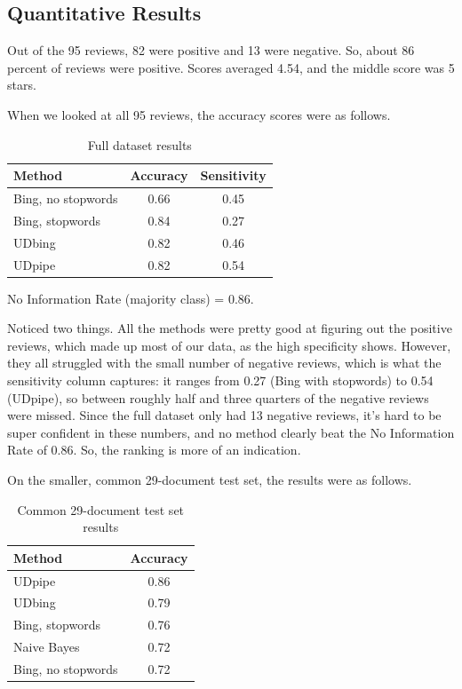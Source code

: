 \documentclass[12pt, a4paper]{article}
\begin{document}
\subsection{Quantitative Results}

Out of the 95 reviews, 82 were positive and 13 were negative. So, about 86 percent of reviews were positive. Scores averaged 4.54, and the middle score was 5 stars.

When we looked at all 95 reviews, the accuracy scores were as follows.

\begin{table}[h]
\centering
\caption{Full dataset results}
\begin{tabular}{lcc}
\toprule
Method & Accuracy & Sensitivity \\
\midrule
Bing, no stopwords & 0.66 & 0.45 \\
Bing, stopwords    & 0.84 & 0.27 \\
UDbing             & 0.82 & 0.46 \\
UDpipe             & 0.82 & 0.54 \\
\bottomrule
\end{tabular}

\vspace{0.5em}
{\small No Information Rate (majority class) = 0.86.}
\end{table}

Noticed two things. All the methods were pretty good at figuring out the positive reviews, which made up most of our data, as the high specificity shows. However, they all struggled with the small number of negative reviews, which is what the sensitivity column captures: it ranges from 0.27 (Bing with stopwords) to 0.54 (UDpipe), so between roughly half and three quarters of the negative reviews were missed. Since the full dataset only had 13 negative reviews, it's hard to be super confident in these numbers, and no method clearly beat the No Information Rate of 0.86. So, the ranking is more of an indication.

On the smaller, common 29-document test set, the results were as follows.

\begin{table}[h]
\centering
\caption{Common 29-document test set results}
\begin{tabular}{lc}
\toprule
Method & Accuracy \\
\midrule
UDpipe             & 0.86 \\
UDbing             & 0.79 \\
Bing, stopwords    & 0.76 \\
Naive Bayes        & 0.72 \\
Bing, no stopwords & 0.72 \\
\bottomrule
\end{tabular}
\end{table}
\end{document}

